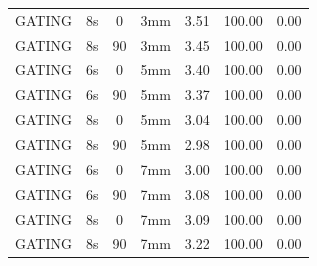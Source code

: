 \documentclass[type=dr, dr=rernat, accentcolor=tud7b,colorbacktitle, bigchapter, openright, twoside, 12pt ]{tudthesis}
\begin{document}
\begin{table}[H]
\begin{tabular}{|c||c|c|c||c|c|c|}
GATING & 8s & 0 & 3mm & 3.51 & 100.00 & 0.00 \\
GATING & 8s & 90 & 3mm & 3.45 & 100.00 & 0.00 \\
GATING & 6s & 0 & 5mm & 3.40 & 100.00 & 0.00 \\
GATING & 6s & 90 & 5mm & 3.37 & 100.00 & 0.00 \\
GATING & 8s & 0 & 5mm & 3.04 & 100.00 & 0.00 \\
GATING & 8s & 90 & 5mm & 2.98 & 100.00 & 0.00 \\
GATING & 6s & 0 & 7mm & 3.00 & 100.00 & 0.00 \\
GATING & 6s & 90 & 7mm & 3.08 & 100.00 & 0.00 \\
GATING & 8s & 0 & 7mm & 3.09 & 100.00 & 0.00 \\
GATING & 8s & 90 & 7mm & 3.22 & 100.00 & 0.00 \\
    \hline\hline 
  \end{tabular}
\end{table}

\newpage
\end{document}
